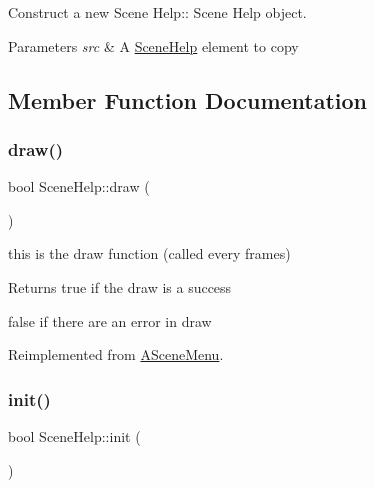 Construct a new Scene Help\+:\+: Scene Help object. 


\begin{DoxyParams}{Parameters}
{\em src} & A \hyperlink{class_scene_help}{Scene\+Help} element to copy \\
\hline
\end{DoxyParams}


\subsection{Member Function Documentation}
\mbox{\label{class_scene_help_a8f6cc7a52fe41d06815ff10a9ac941a2}} 
\subsubsection{\texorpdfstring{draw()}{draw()}}
{\footnotesize\ttfamily bool Scene\+Help\+::draw (\begin{DoxyParamCaption}{ }\end{DoxyParamCaption})\hspace{0.3cm}{\ttfamily [virtual]}}



this is the draw function (called every frames) 

\begin{DoxyReturn}{Returns}
true if the draw is a success 

false if there are an error in draw 
\end{DoxyReturn}


Reimplemented from \hyperlink{class_a_scene_menu_a5c11f34c83f025e1181219bf25ce4694}{A\+Scene\+Menu}.

\mbox{\label{class_scene_help_adabf402b245092d311b08ec1139aa3c5}} 
\subsubsection{\texorpdfstring{init()}{init()}}
{\footnotesize\ttfamily bool Scene\+Help\+::init (\begin{DoxyParamCaption}{ }\end{DoxyParamCaption})\hspace{0.3cm}{\ttfamily [virtual]}}



